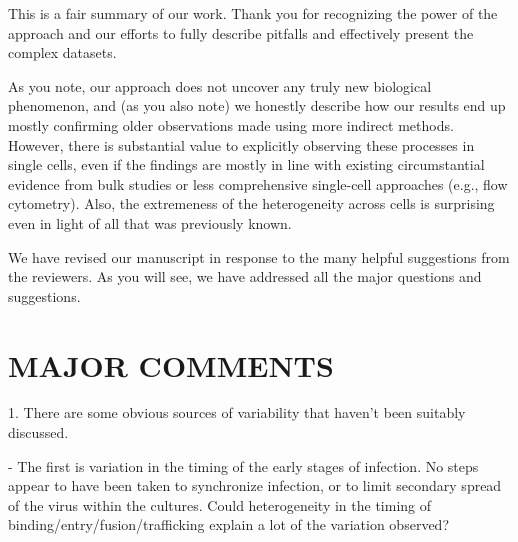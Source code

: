 \documentclass[11pt, oneside]{article}   	%
\begin{document}
{\color{black}
This is a fair summary of our work.
Thank you for recognizing the power of the approach and our efforts to fully describe pitfalls and effectively present the complex datasets.

As you note, our approach does not uncover any truly new biological phenomenon, and (as you also note) we honestly describe how our results end up mostly confirming older observations made using more indirect methods.
However, there is substantial value to explicitly observing these processes in single cells, even if the findings are mostly in line with existing circumstantial evidence from bulk studies or less comprehensive single-cell approaches (e.g., flow cytometry).
Also, the extremeness of the heterogeneity across cells is surprising even in light of all that was previously known.

We have revised our manuscript in response to the many helpful suggestions from the reviewers.
As you will see, we have addressed all the major questions and suggestions.
}

\section*{MAJOR COMMENTS} 

1. There are some obvious sources of variability that haven't been suitably discussed. 

- The first is variation in the timing of the early stages of infection. No steps appear to have been taken to synchronize infection, or to limit secondary spread of the virus within the cultures. Could heterogeneity in the timing of binding/entry/fusion/trafficking explain a lot of the variation observed? 
\end{document}
